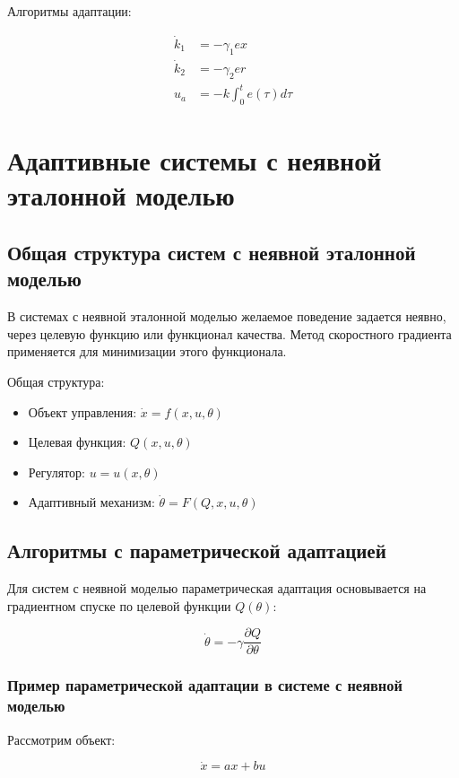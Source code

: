 \documentclass[a4paper,14pt]{extarticle} %
\begin{document}
Алгоритмы адаптации:

\begin{equation}
\begin{aligned}
\dot{k}_1 &= -\gamma_1 e x \\
\dot{k}_2 &= -\gamma_2 e r \\
u_a &= -k \int_0^t e(\tau) d\tau
\end{aligned}
\end{equation}

\section{Адаптивные системы с неявной эталонной моделью}
\subsection{Общая структура систем с неявной эталонной моделью}
В системах с неявной эталонной моделью желаемое поведение задается неявно, через целевую функцию или функционал качества. Метод скоростного градиента применяется для минимизации этого функционала.

Общая структура:
\begin{itemize}
    \item Объект управления: $\dot{x} = f(x, u, \theta)$
    \item Целевая функция: $Q(x, u, \theta)$
    \item Регулятор: $u = u(x, \theta)$
    \item Адаптивный механизм: $\dot{\theta} = F(Q, x, u, \theta)$
\end{itemize}

\subsection{Алгоритмы с параметрической адаптацией}
Для систем с неявной моделью параметрическая адаптация основывается на градиентном спуске по целевой функции $Q(\theta)$:

\begin{equation}
\dot{\theta} = -\gamma \frac{\partial Q}{\partial \theta}
\end{equation}

\subsubsection{Пример параметрической адаптации в системе с неявной моделью}
Рассмотрим объект:

\begin{equation}
\dot{x} = ax + bu
\end{equation}
\end{document}
